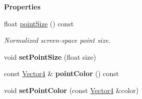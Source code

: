 \begin{Indent}\textbf{ Properties}\par
\begin{DoxyCompactItemize}
\item 
\mbox{\label{classrev_1_1_points_a1e14f7db4c7dea5c332575c0284e07e6}} 
float \mbox{\hyperlink{classrev_1_1_points_a1e14f7db4c7dea5c332575c0284e07e6}{point\+Size}} () const
\begin{DoxyCompactList}\small\item\em Normalized screen-\/space point size. \end{DoxyCompactList}\item 
\mbox{\label{classrev_1_1_points_ad94fb3d768e290644051f8c69a048682}} 
void {\bfseries set\+Point\+Size} (float size)
\item 
\mbox{\label{classrev_1_1_points_a18542dc462e870960b8319ea694b5666}} 
const \mbox{\hyperlink{classrev_1_1_vector}{Vector4}} \& {\bfseries point\+Color} () const
\item 
\mbox{\label{classrev_1_1_points_a5e992ad23aa58455cf19d1893558fef5}} 
void {\bfseries set\+Point\+Color} (const \mbox{\hyperlink{classrev_1_1_vector}{Vector4}} \&color)
\end{DoxyCompactItemize}
\end{Indent}
